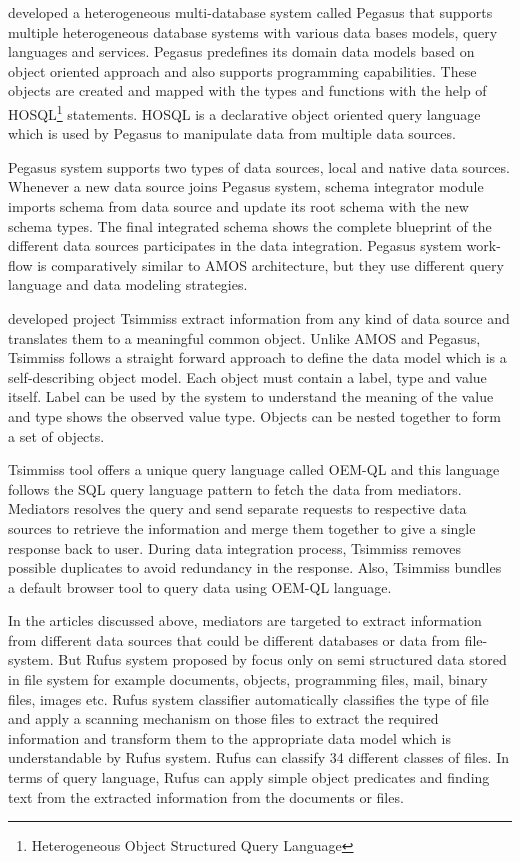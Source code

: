 \documentclass[12pt]{article}
\begin{document}
\citet{ahmed1991pegasus} developed a heterogeneous multi-database system called Pegasus that supports multiple heterogeneous database systems with various data bases models, query languages and services. Pegasus predefines its domain data models based on object oriented approach and also supports programming capabilities. These objects are created and mapped with the types and functions with the help of HOSQL\footnote{\label{myfootnote}Heterogeneous Object Structured Query Language} statements. HOSQL is a declarative object oriented query language which is used by Pegasus to manipulate data from multiple data sources.



Pegasus system supports two types of data sources, local and native data sources. Whenever a new data source joins Pegasus system, schema integrator module imports schema from data source and update its root schema with the new schema types. The final integrated schema shows the complete blueprint of the different data sources participates in the data integration. Pegasus system work-flow is comparatively similar to AMOS architecture, but they use different query language and data modeling strategies.

\citet{chawathe1994tsimmis} developed project Tsimmiss extract information from any kind of data source and translates them to a meaningful common object. Unlike AMOS and Pegasus, Tsimmiss follows a straight forward approach to define the data model which is a self-describing object model. Each object must contain a label, type and value itself. Label can be used by the system to understand the meaning of the value and type shows the observed value type. Objects can be nested together to form a set of objects. 

Tsimmiss tool offers a unique query language called OEM-QL and this language follows the SQL query language pattern to fetch the data from mediators. Mediators resolves the query and send separate requests to respective data sources to retrieve the information and merge them together to give a single response back to user. During data integration process, Tsimmiss removes possible duplicates to avoid redundancy in the response. Also, Tsimmiss bundles a default browser tool to query data using OEM-QL language.

In the articles discussed above, mediators are targeted to extract information from different data sources that could be different databases or data from file-system. But Rufus system proposed by \citet{shoens1993rufus} focus only on semi structured data stored in file system for example documents, objects, programming files, mail, binary files, images etc. Rufus system classifier automatically classifies the type of file and apply a scanning mechanism on those files to extract the required information and transform them to the appropriate data model which is understandable by Rufus system. Rufus can classify 34 different classes of files. In terms of query language, Rufus can apply simple object predicates and finding text from the extracted information from the documents or files.
\end{document}
